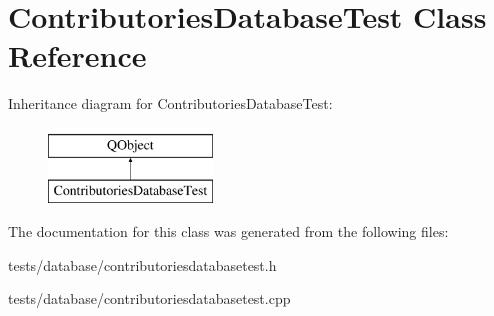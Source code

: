 \hypertarget{classContributoriesDatabaseTest}{}\section{Contributories\+Database\+Test Class Reference}
\label{classContributoriesDatabaseTest}
Inheritance diagram for Contributories\+Database\+Test\+:\begin{figure}[H]
\begin{center}
\leavevmode
\includegraphics[height=2.000000cm]{d8/df7/classContributoriesDatabaseTest}
\end{center}
\end{figure}


The documentation for this class was generated from the following files\+:\begin{DoxyCompactItemize}
\item 
tests/database/contributoriesdatabasetest.\+h\item 
tests/database/contributoriesdatabasetest.\+cpp\end{DoxyCompactItemize}
